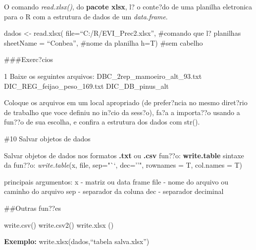 \documentclass[]{book}
\begin{document}
O comando \emph{read.xlsx()}, do \textbf{pacote xlsx}, l? o conte?do de uma planilha eletronica para o R com a estrutura de dados de um \emph{data.frame}.

dados \textless{}- read.xlsx(
file=``C:/R/EVI\_Prec2.xlsx'', \#comando que l? planilhas
sheetName = ``Conbea'', \#nome da planilha
h=T) \#sem cabelho

\#\#\#Exerc?cios

1 Baixe os seguintes arquivos:
DBC\_2rep\_mamoeiro\_alt\_93.txt
DIC\_REG\_feijao\_peso\_169.txt
DIC\_DB\_pinus\_alt

Coloque os arquivos em um local apropriado (de prefer?ncia no mesmo diret?rio de trabalho que voce definiu no in?cio da sess?o), fa?a a importa??o usando a fun??o de sua escolha, e confira a estrutura dos dados com str().

\#10 Salvar objetos de dados

Salvar objetos de dados nos formatos \textbf{.txt} ou \textbf{.csv}
fun??o: \textbf{write.table}
sintaxe da fun??o:
\emph{write.table}(x, file, sep="``, dec=''", rownames = T, col.names = T)

principais argumentos:
x - matriz ou data frame
file - nome do arquivo ou caminho do arquivo
sep - separador da coluna
dec - separador deciminal

\#\#Outras fun??es

write.csv()
write.csv2()
write.xlsx ()

\textbf{Exemplo:}
write.xlsx(dados,``tabela salva.xlsx'')


\end{document}
